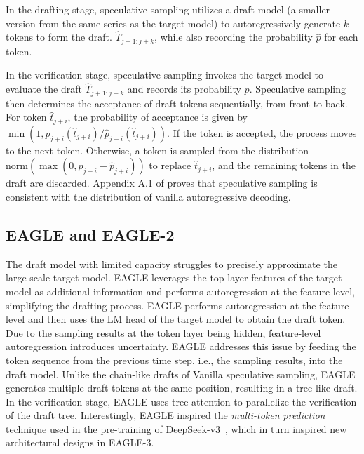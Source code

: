 \documentclass[11pt]{article}
\begin{document}
In the drafting stage, speculative sampling utilizes a draft model (a smaller version from the same series as the target model) to autoregressively generate $k$ tokens to form the draft. $\hat{T}_{j+1:j+k}$, while also recording the probability $\hat{p}$ for each token.

In the verification stage, speculative sampling invokes the target model to evaluate the draft $\hat{T}_{j+1:j+k}$ and records its probability $p$. Speculative sampling then determines the acceptance of draft tokens sequentially, from front to back. For token $\hat{t}_{j+i}$, the probability of acceptance is given by $\min(1, p_{j+i}(\hat{t}_{j+i})/\hat{p}_{j+i}(\hat{t}_{j+i}))$. If the token is accepted, the process moves to the next token. Otherwise, a token is sampled from the distribution $\text{norm}(\max(0, p_{j+i} - \hat{p}_{j+i}))$ to replace $\hat{t}_{j+i}$, and the remaining tokens in the draft are discarded. 
Appendix A.1 of \cite{leviathan2023fast} proves that speculative sampling is consistent with the distribution of vanilla autoregressive decoding. 
\subsection{EAGLE and EAGLE-2}

The draft model with limited capacity struggles to precisely approximate the large-scale target model. EAGLE leverages the top-layer features of the target model as additional information and performs autoregression at the feature level, simplifying the drafting process. EAGLE performs autoregression at the feature level and then uses the LM head of the target model to obtain the draft token. Due to the sampling results at the token layer being hidden, feature-level autoregression introduces uncertainty. EAGLE addresses this issue by feeding the token sequence from the previous time step, i.e., the sampling results, into the draft model.
Unlike the chain-like drafts of Vanilla speculative sampling, EAGLE generates multiple draft tokens at the same position, resulting in a tree-like draft. In the verification stage, EAGLE uses tree attention to parallelize the verification of the draft tree. Interestingly, EAGLE inspired the \emph{multi-token prediction} technique used in the pre-training of DeepSeek-v3~\cite{liu2024deepseek}, which in turn inspired new architectural designs in EAGLE-3.
\end{document}
